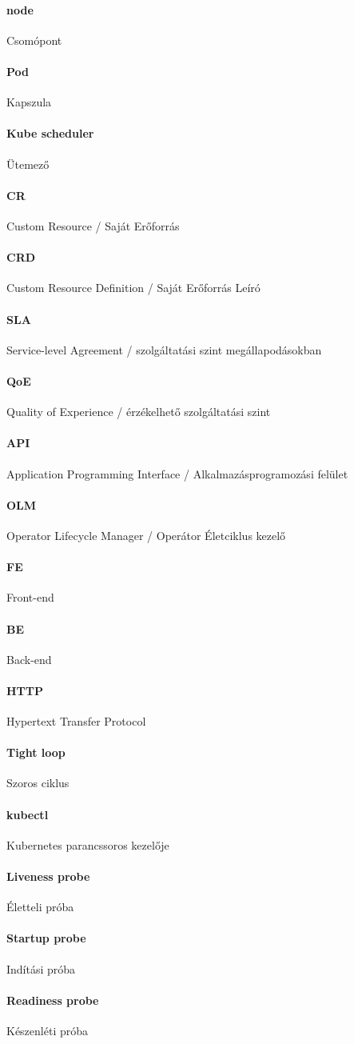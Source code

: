 \paragraph{node} Csomópont
\paragraph{Pod} Kapszula
\paragraph{Kube scheduler} Ütemező
\paragraph{CR} Custom Resource / Saját Erőforrás
\paragraph{CRD} Custom Resource Definition / Saját Erőforrás Leíró
\paragraph{SLA} Service-level Agreement / szolgáltatási szint megállapodásokban
\paragraph{QoE} Quality of Experience / érzékelhető szolgáltatási szint
\paragraph{API} Application Programming Interface / Alkalmazásprogramozási felület
\paragraph{OLM} Operator Lifecycle Manager / Operátor Életciklus kezelő
\paragraph{FE} Front-end
\paragraph{BE} Back-end
\paragraph{HTTP} Hypertext Transfer Protocol
\paragraph{Tight loop} Szoros ciklus
\paragraph{kubectl} Kubernetes parancssoros kezelője
\paragraph{Liveness probe} Életteli próba
\paragraph{Startup probe} Indítási próba
\paragraph{Readiness probe} Készenléti próba
